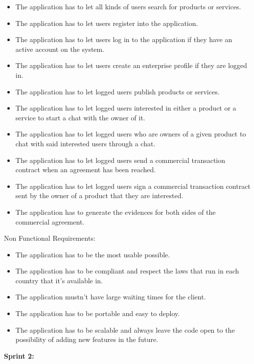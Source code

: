 \documentclass[./main.tex]{subfiles}
\begin{document}
\begin{itemize}

\item
  The application has to let all kinds of users search for products or
  services.
\item
  The application has to let users register into the application.
\item
  The application has to let users log in to the application if they
  have an active account on the system.
\item
  The application has to let users create an enterprise profile if they
  are logged in.
\item
  The application has to let logged users publish products or services.
\item
  The application has to let logged users interested in either a product
  or a service to start a chat with the owner of it.
\item
  The application has to let logged users who are owners of a given
  product to chat with said interested users through a chat.
\item
  The application has to let logged users send a commercial transaction
  contract when an agreement has been reached.
\item
  The application has to let logged users sign a commercial transaction
  contract sent by the owner of a product that they are interested.
\item
  The application has to generate the evidences for both sides of the
  commercial agreement.
\end{itemize}

Non Functional Requirements:

\begin{itemize}

\item
  The application has to be the most usable possible.
\item
  The application has to be compliant and respect the laws that run in
  each country that it's available in.
\item
  The application mustn't have large waiting times for the client.
\item
  The application has to be portable and easy to deploy.
\item
  The application has to be scalable and always leave the code open to
  the possibility of adding new features in the future.
\end{itemize}

\textbf{Sprint 2:}
\end{document}
